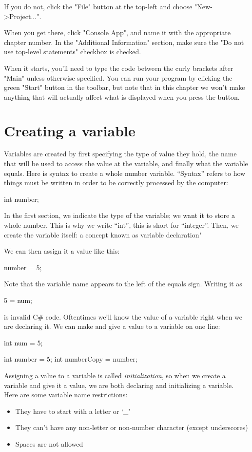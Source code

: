 \documentclass[oneside, openany] {book}
\begin{document}
If you do not, click the "File" button at the top-left and choose "New->Project...".

When you get there, click "Console App", and name it with the appropriate chapter number. In the "Additional Information" section, make sure the "Do not use top-level statements" checkbox is checked.

When it starts, you'll need to type the code between the curly brackets after "Main" unless otherwise specified. You can run your program by clicking the green "Start" button in the toolbar, but note that in this chapter we won't make anything that will actually affect what is displayed when you press the button.

\section{Creating a variable}
Variables are created by first specifying the type of value they hold, the name that will be used to access the value at the variable, and finally what the variable equals.
Here is syntax to create a whole number variable. “Syntax” refers to how things must be written in order to be correctly processed by the computer:
\begin{CSharp}
int number;
\end{CSharp}
In the first section, we indicate the type of the variable; we  want it to store a whole number. This is why we write “int”, this is short for “integer”. Then, we create the variable itself: a concept known as variable declaration"

We can then assign it a value like this:

\begin{CSharp}
number = 5;
\end{CSharp}
Note that the variable name appears to the left of the equals sign. Writing it as

\begin{CSharp}
5 = num;
\end{CSharp}
is invalid C\# code.
Oftentimes we'll know the value of a variable right when we are declaring it. We can make and give a value to a variable on one line:

\begin{CSharp}
int num = 5;
\end{CSharp}
\begin{CSharp}
int number = 5;
int numberCopy = number;
\end{CSharp}
Assigning a value to a variable is called \emph{initialization}, so when we create a variable and give it a value, we are both declaring and initializing a variable. 
Here are some variable name restrictions:
\begin{itemize}
\item They have to start with a letter or `\_'
\item They can’t have any non-letter or non-number character (except underscores)
\item Spaces are not allowed
\end{itemize}
\end{document}

